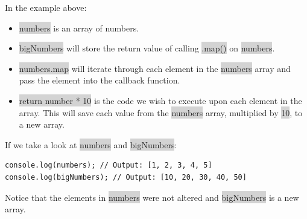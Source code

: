 \documentclass[11pt]{article}
\begin{document}
In the example above:
\begin{itemize}[leftmargin = *]
\item \colorbox{lightgray}{numbers} is an array of numbers.
\item \colorbox{lightgray}{bigNumbers} will store the return value of calling \colorbox{lightgray}{.map()} on \colorbox{lightgray}{numbers}.
\item \colorbox{lightgray}{numbers.map} will iterate through each element in the \colorbox{lightgray}{numbers} array and pass the element into the callback function.
\item \colorbox{lightgray}{return number * 10} is the code we wish to execute upon each element in the array. This will save each value from the \colorbox{lightgray}{numbers} array, multiplied by \colorbox{lightgray}{10}, to a new array.
\end{itemize}
If we take a look at \colorbox{lightgray}{numbers} and \colorbox{lightgray}{bigNumbers}:
\begin{lstlisting}
console.log(numbers); // Output: [1, 2, 3, 4, 5]
console.log(bigNumbers); // Output: [10, 20, 30, 40, 50]
\end{lstlisting}
Notice that the elements in \colorbox{lightgray}{numbers} were not altered and \colorbox{lightgray}{bigNumbers} is a new array.
\end{document}
